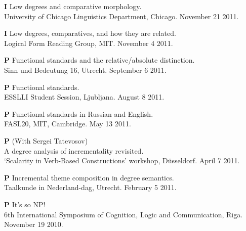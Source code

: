 \documentclass[12pt,letterpaper]{article}
\begin{document}
{\begin{hangparas}{.25in}{1}
\vspace{1mm}

\textbf{I} \hspace{2mm} Low degrees and comparative morphology. \\University of Chicago Linguistics Department, Chicago. November 21 2011.

\vspace{1mm}

\textbf{I} \hspace{2mm} Low degrees, comparatives, and how they are related. \\Logical Form Reading Group, MIT. November 4 2011.

\vspace{1mm}

\textbf{P} \hspace{1.2mm} Functional standards and the relative/absolute distinction. \\Sinn und Bedeutung 16, Utrecht. September 6 2011.

\vspace{1mm}

\textbf{P} \hspace{1.2mm} Functional standards. \\ESSLLI Student Session, Ljubljana. August 8 2011.

\vspace{1mm}

\textbf{P} \hspace{1.2mm} Functional standards in Russian and English. \\ FASL20, MIT, Cambridge.  May 13 2011.

\vspace{1mm}

\textbf{P} \hspace{1.2mm} (With Sergei Tatevosov) \\A degree analysis of incrementality revisited. \\`Scalarity in Verb-Based Constructions' workshop, D\"{u}sseldorf. April 7 2011.

\vspace{1mm}

\textbf{P} \hspace{1.2mm} Incremental theme composition in degree semantics. \\Taalkunde in Nederland-dag, Utrecht. February 5 2011.

\vspace{1mm}

\textbf{P} \hspace{1.2mm} It's so NP! \\ 6th International Symposium of Cognition, Logic and Communication, Riga. November 19 2010. 


\end{hangparas}}
\end{document}
